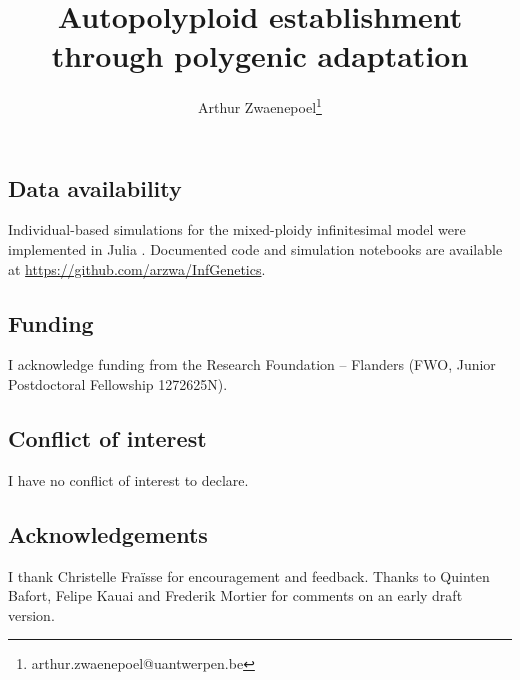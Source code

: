 \documentclass[12pt,a4paper]{article}
\begin{document}
\title{Autopolyploid establishment through polygenic adaptation}
\author[1]{Arthur Zwaenepoel\thanks{arthur.zwaenepoel@uantwerpen.be}}
\date{\vspace{-5ex}}
\maketitle

\subsection*{Data availability}

Individual-based simulations for the mixed-ploidy infinitesimal model were
implemented in Julia \citep{julia}.
Documented code and simulation notebooks are available at 
\url{https://github.com/arzwa/InfGenetics}.

\subsection*{Funding} 

I acknowledge funding from the Research Foundation -- Flanders (FWO, Junior
Postdoctoral Fellowship 1272625N).

\subsection*{Conflict of interest}

I have no conflict of interest to declare.

\subsection*{Acknowledgements}

I thank Christelle Fraïsse for encouragement and feedback. Thanks to Quinten
Bafort, Felipe Kauai and Frederik Mortier for comments on an early draft
version.




\end{document}
